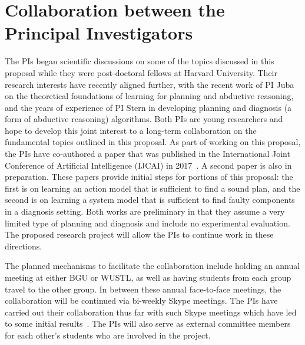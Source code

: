 \documentclass[12pt]{article}
\begin{document}
\section{Collaboration between the Principal Investigators}
The PIs began scientific discussions on some of the topics discussed in this proposal while they were post-doctoral fellows at Harvard University.
Their research interests have recently aligned further, 
with the recent work of PI Juba on the theoretical foundations of learning for planning and abductive reasoning, and the years of experience of PI Stern in developing planning and diagnosis (a form of abductive reasoning) algorithms. 
Both PIs are young researchers and hope to develop this joint interest to a long-term collaboration on the fundamental topics outlined in this proposal.
As part of working on this proposal, the PIs have co-authored a paper that was published in the International Joint Conference of Artificial Intelligence (IJCAI) in  2017~\cite{stern2017efficientAndSafe}. A second paper is also in preparation. These papers provide initial steps for portions of this proposal: the first is on learning an action model that is sufficient to find a sound plan, and the second is on learning a system model that is sufficient to find faulty components in a diagnosis setting. Both works are preliminary in that they assume a very limited type of planning and diagnosis and include no experimental evaluation. The proposed research project will allow the PIs to continue  work in these directions.


The planned mechanisms to facilitate the collaboration include holding an annual meeting at either BGU or WUSTL, as well as having students from each group travel to the other group. In between these annual face-to-face meetings, the collaboration will be continued via bi-weekly Skype meetings. The PIs have carried out their collaboration thus far with such Skype meetings which have led to some initial results~\cite{stern2017efficientAndSafe}.  
The PIs will also serve as external committee members for each other's students who are involved in the project.
\end{document}
